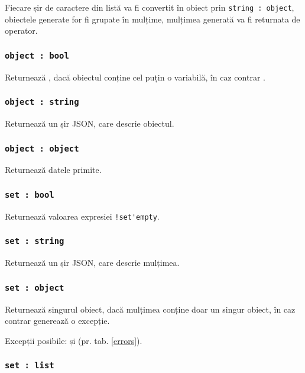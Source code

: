 Fiecare șir de caractere din listă va fi convertit în obiect prin \lstinline|string : object|, obiectele generate for fi grupate în mulțime, mulțimea generată va fi returnata de operator.

\subsubsection{\lstinline|object : bool|}

Returnează \true, dacă obiectul conține cel puțin o variabilă, în caz contrar \false.

\subsubsection{\lstinline|object : string|}

Returnează un șir JSON, care descrie obiectul.

\subsubsection{\lstinline|object : object|}

Returnează datele primite.

\subsubsection{\lstinline|set : bool|}

Returnează valoarea expresiei \lstinline|!set'empty|.

\subsubsection{\lstinline|set : string|}

Returnează un șir JSON, care descrie mulțimea.

\subsubsection{\lstinline|set : object|}

Returnează singurul obiect, dacă mulțimea conține doar un singur obiect, în caz contrar generează o excepție.

Excepții posibile:  și  (pr. tab. \ref{errors}).

\subsubsection{\lstinline|set : list|}

